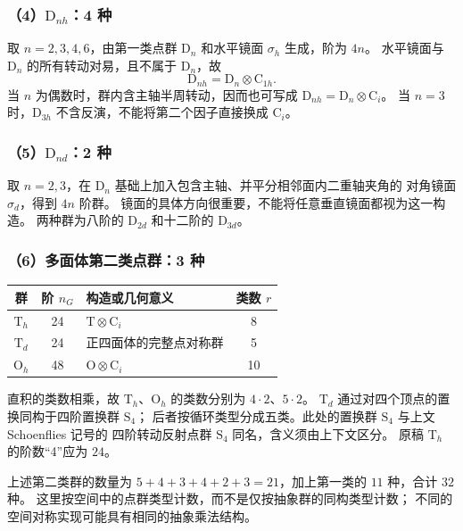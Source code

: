 \subsubsection*{（4）$\mathrm{D}_{nh}$：4 种}
取 $n=2,3,4,6$，由第一类点群 $\mathrm{D}_n$ 和水平镜面 $\sigma_h$ 生成，阶为 $4n$。
水平镜面与 $\mathrm{D}_n$ 的所有转动对易，且不属于 $\mathrm{D}_n$，故
\begin{equation}
\mathrm{D}_{nh}=\mathrm{D}_n\otimes\mathrm{C}_{1h}.
\end{equation}
当 $n$ 为偶数时，群内含主轴半周转动，因而也可写成
$\mathrm{D}_{nh}=\mathrm{D}_n\otimes\mathrm{C}_i$。
当 $n=3$ 时，$\mathrm{D}_{3h}$ 不含反演，不能将第二个因子直接换成 $\mathrm{C}_i$。

\subsubsection*{（5）$\mathrm{D}_{nd}$：2 种}
取 $n=2,3$，在 $\mathrm{D}_n$ 基础上加入包含主轴、并平分相邻面内二重轴夹角的
对角镜面 $\sigma_d$，得到 $4n$ 阶群。
镜面的具体方向很重要，不能将任意垂直镜面都视为这一构造。
两种群为八阶的 $\mathrm{D}_{2d}$ 和十二阶的 $\mathrm{D}_{3d}$。

\subsubsection*{（6）多面体第二类点群：3 种}
\begin{center}
\begin{tabular}{cclc}
\toprule
群 & 阶 $n_G$ & 构造或几何意义 & 类数 $r$\\\midrule
$\mathrm{T}_h$ & 24 & $\mathrm{T}\otimes\mathrm{C}_i$ & 8\\
$\mathrm{T}_d$ & 24 & 正四面体的完整点对称群 & 5\\
$\mathrm{O}_h$ & 48 & $\mathrm{O}\otimes\mathrm{C}_i$ & 10\\\bottomrule
\end{tabular}
\end{center}
直积的类数相乘，故 $\mathrm{T}_h$、$\mathrm{O}_h$ 的类数分别为 $4\cdot2$、$5\cdot2$。
$\mathrm{T}_d$ 通过对四个顶点的置换同构于四阶置换群 $\mathrm{S}_4$；
后者按循环类型分成五类。此处的置换群 $\mathrm{S}_4$ 与上文 Schoenflies 记号的
四阶转动反射点群 $\mathrm{S}_4$ 同名，含义须由上下文区分。
原稿 $\mathrm{T}_h$ 的阶数“4”应为 $24$。

上述第二类群的数量为 $5+4+3+4+2+3=21$，加上第一类的 $11$ 种，合计 $32$ 种。
这里按空间中的点群类型计数，而不是仅按抽象群的同构类型计数；
不同的空间对称实现可能具有相同的抽象乘法结构。

